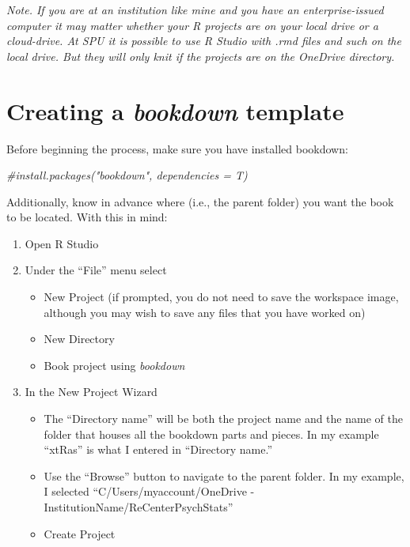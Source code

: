 \documentclass[
]{book}
\newenvironment{Shaded}{\begin{snugshade}}{\end{snugshade}}
\newcommand{\CommentTok}[1]{\textcolor[rgb]{0.56,0.35,0.01}{\textit{#1}}}
\providecommand{\tightlist}{%
  \setlength{\itemsep}{0pt}\setlength{\parskip}{0pt}}
\begin{document}
\emph{Note. If you are at an institution like mine and you have an enterprise-issued computer it may matter whether your R projects are on your local drive or a cloud-drive. At SPU it is possible to use R Studio with .rmd files and such on the local drive. But they will only knit if the projects are on the OneDrive directory.}

\hypertarget{creating-a-bookdown-template}{%
\section{\texorpdfstring{Creating a \emph{bookdown} template}{Creating a bookdown template}}\label{creating-a-bookdown-template}}

Before beginning the process, make sure you have installed bookdown:

\begin{Shaded}
\begin{Highlighting}[]
\CommentTok{\#install.packages("bookdown", dependencies = T)}
\end{Highlighting}
\end{Shaded}

Additionally, know in advance where (i.e., the parent folder) you want the book to be located. With this in mind:

\begin{enumerate}
\def\labelenumi{\arabic{enumi}.}
\tightlist
\item
  Open R Studio
\item
  Under the ``File'' menu select

  \begin{itemize}
  \tightlist
  \item
    New Project (if prompted, you do not need to save the workspace image, although you may wish to save any files that you have worked on)
  \item
    New Directory
  \item
    Book project using \emph{bookdown}
  \end{itemize}
\item
  In the New Project Wizard

  \begin{itemize}
  \tightlist
  \item
    The ``Directory name'' will be both the project name and the name of the folder that houses all the bookdown parts and pieces. In my example ``xtRas'' is what I entered in ``Directory name.''
  \item
    Use the ``Browse'' button to navigate to the parent folder. In my example, I selected ``C/Users/myaccount/OneDrive - InstitutionName/ReCenterPsychStats''
  \item
    Create Project
  \end{itemize}
\end{enumerate}
\end{document}

